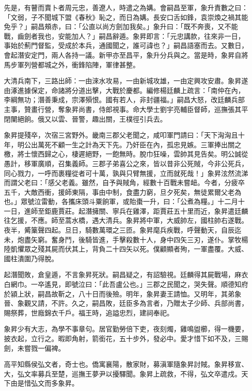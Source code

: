 \begin{pinyinscope}
先是，有瞽而賣卜者周元忠，善遼人，時遣之為媾。會嗣昌至軍，象升責數之曰：「文弱，子不聞城下盟《春秋》恥之，而日為媾。長安口舌如鋒，袁崇煥之禍其能免乎？」嗣昌頰赤，曰：「公直以尚方劍加我矣。」象升曰：「既不奔喪，又不能戰，齒劍者我也，安能加人？」嗣昌辭遁。象昇即言：「元忠講款，往來非一日，事始於薊門督監，受成於本兵，通國聞之，誰可諱也？」嗣昌語塞而去。又數日，會起潛安定門，兩人各持一議。新甲亦至昌平，象升分兵與之。當是時，象昇自將馬步軍列營都城之外，衝鋒陷陣，軍律甚整。

大清兵南下，三路出師：一由淶水攻易，一由新城攻雄，一由定興攻安肅。象昇遂由涿進據保定，命諸將分道出擊，大戰於慶都。編修楊廷麟上疏言：「南仲在內，李綱無功；潛善秉成，宗澤殞恨。國有若人，非封疆福。」嗣昌大怒，改廷麟兵部主事，贊畫行營，奪象昇尚書，侍郎視事。命大學士劉宇亮輔臣督師，巡撫張其平閉闉絕餉。俄又以雲、晉警，趣出關，王樸徑引兵去。

象昇提殘卒，次宿三宮野外。畿南三郡父老聞之，咸叩軍門請曰：「天下洶洶且十年，明公出萬死不顧一生之計為天下先。乃奸臣在內，孤忠見嫉。三軍捧出關之檄，將士懷西歸之心，棲遲絕野，一飽無時。脫巾狂噪，雲帥其見告矣。明公誠從愚計，移軍廣順，召集義師。三郡子弟喜公之來，皆以昔非公死賊，今非公死兵，同心戮力，一呼而裹糧從者可十萬，孰與只臂無援，立而就死哉！」象昇泫然流涕而謂父老曰：「感父老義。雖然，自予與賊角，經數十百戰未嘗衄。今者，分疲卒五千，大敵西衝，援師東隔，事由中制，食盡力窮，旦夕死矣，無徒累爾父老為也。」眾號泣雷動，各攜床頭斗粟餉軍，或貽棗一升，曰：「公煮為糧。」十二月十一日，進師至鉅鹿賈莊。起潛擁關、寧兵在雞澤，距賈莊五十里而近，象昇遣廷麟往乞援，不應。師至蒿水橋，遇大清兵。象昇將中軍，大威帥左，國柱帥右遂戰。夜半，觱篥聲四起。旦日，騎數萬環之三匝。象昇麾兵疾戰，呼聲動天，自辰迄未，炮盡矢窮。奮身鬥，後騎皆進，手擊殺數十人，身中四矢三刃，遂仆。掌牧楊陸凱懼眾之殘其屍而伏其上，背負二十四矢以死。僕顧顯者殉，一軍盡覆。大威、國柱潰圍乃得脫。

起潛聞敗，倉皇遁，不言象昇死狀。嗣昌疑之，有詔驗視。廷麟得其屍戰場，麻衣白網巾。一卒遙見，即號泣曰：「此吾盧公也。」三郡之民聞之，哭失聲。順德知府於潁上狀，嗣昌故靳之，八十日而後殮。明年，象昇妻王請恤。又明年，其弟象晉、象觀又請，不許。久之，嗣昌敗，廷臣多為言者，乃贈太子少師、兵部尚書，賜祭葬，世廕錦衣千戶。福王時，追謚忠烈，建祠奉祀。

象昇少有大志，為學不事章句。居官勤勞倍下吏，夜刻燭，雞鳴盥櫛，得一機要，披衣起，立行之。暇即角射，箭銜花，五十步外，發必中。愛才惜下如不及，三賜劍，未嘗戮一偏裨。

高平知縣侯弘文者，奇士也。僑寓襄陽，散家財，募滇軍隨象昇討賊。象昇移宣、大，弘文率募兵至楚，巡撫王夢尹以擾驛聞。象昇上疏救，不得，弘文卒遣戍。天下由是惜弘文而多象昇。


\end{pinyinscope}

